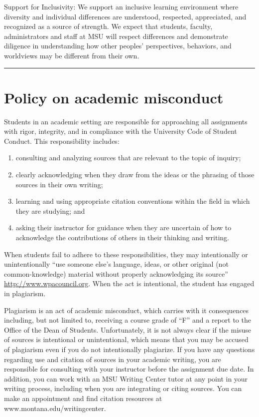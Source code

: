 \documentclass[
]{article}
\providecommand{\tightlist}{%
  \setlength{\itemsep}{0pt}\setlength{\parskip}{0pt}}
\begin{document}
Support for Inclusivity: We support an inclusive learning environment
where diversity and individual differences are understood, respected,
appreciated, and recognized as a source of strength. We expect that
students, faculty, administrators and staff at MSU will respect
differences and demonstrate diligence in understanding how other
peoples' perspectives, behaviors, and worldviews may be different from
their own.

\begin{center}\rule{0.5\linewidth}{0.5pt}\end{center}

\section{Policy on academic
misconduct}\label{policy-on-academic-misconduct}

Students in an academic setting are responsible for approaching all
assignments with rigor, integrity, and in compliance with the University
Code of Student Conduct. This responsibility includes:

\begin{enumerate}
\def\labelenumi{\arabic{enumi}.}
\tightlist
\item
  consulting and analyzing sources that are relevant to the topic of
  inquiry;
\item
  clearly acknowledging when they draw from the ideas or the phrasing of
  those sources in their own writing;
\item
  learning and using appropriate citation conventions within the field
  in which they are studying; and
\item
  asking their instructor for guidance when they are uncertain of how to
  acknowledge the contributions of others in their thinking and writing.
\end{enumerate}

When students fail to adhere to these responsibilities, they may
intentionally or unintentionally ``use someone else's language, ideas,
or other original (not common-knowledge) material without properly
acknowledging its source'' \url{http://www.wpacouncil.org}. When the act
is intentional, the student has engaged in plagiarism.

Plagiarism is an act of academic misconduct, which carries with it
consequences including, but not limited to, receiving a course grade of
``F'' and a report to the Office of the Dean of Students. Unfortunately,
it is not always clear if the misuse of sources is intentional or
unintentional, which means that you may be accused of plagiarism even if
you do not intentionally plagiarize. If you have any questions regarding
use and citation of sources in your academic writing, you are
responsible for consulting with your instructor before the assignment
due date. In addition, you can work with an MSU Writing Center tutor at
any point in your writing process, including when you are integrating or
citing sources. You can make an appointment and find citation resources
at www.montana.edu/writingcenter.
\end{document}
